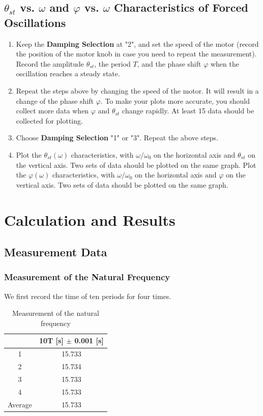 \documentclass[12pt]{article}
\begin{document}
\subsection{$\theta_{st}$ vs. $\omega$ and $\varphi$ vs. $\omega$ Characteristics of Forced Oscillations}
\begin{enumerate}
\item Keep the \textbf{Damping Selection} at "2", and set the speed of the motor (record the
position of the motor knob in case you need to repeat the measurement). Record
the amplitude $\theta_{st}$, the period $T$, and the phase shift $\varphi$ when the oscillation reaches a steady state.
\item Repeat the steps above by changing the speed of the motor. It will result in a change
of the phase shift $\varphi$. To make your plots more accurate, you should collect more data when $\varphi$ and $\theta_{st}$ change rapidly. At least 15 data should be collected for plotting.
\item Choose \textbf{Damping Selection} "1" or "3". Repeat the above steps.
\item Plot the $\theta_{st}(\omega)$ characteristics, with $\omega/\omega_0$ on the horizontal axis and $\theta_{st}$ on the vertical axis. Two sets of data should be plotted on the same graph.
Plot the $\varphi(\omega)$ characteristics, with $\omega/\omega_0$ on the horizontal axis and $\varphi$ on the vertical axis. Two sets of data should be plotted on the same graph.
\end{enumerate}
\section{Calculation and Results}
\subsection{Measurement Data}
\subsubsection{Measurement of the Natural Frequency}
We first record the time of ten periods for four times.
\begin{table}[H]
\centering
\begin{tabular}{|c|c|}
\hline
        & 10T [s] $\pm$ 0.001 [s]       \\ \hline
1       & 15.733 \\ \hline
2       & 15.734 \\ \hline
3       & 15.733 \\ \hline
4       & 15.733 \\ \hline
Average & 15.733 \\ \hline
\end{tabular}
\caption{Measurement of the natural frequency}
\end{table}
\end{document}
